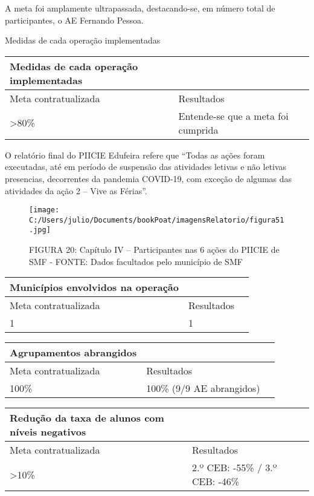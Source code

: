 \documentclass[
]{book}
\begin{document}
A meta foi amplamente ultrapassada, destacando-se, em número total de participantes, o AE Fernando Pessoa.

Medidas de cada operação implementadas

\begin{longtable}[]{@{}lll@{}}
\toprule()
Medidas de cada operação implementadas & & \\
\midrule()
\endhead
Meta contratualizada & Resultados & \\
\textgreater80\% & Entende-se que a meta foi cumprida & \\
\bottomrule()
\end{longtable}

O relatório final do PIICIE Edufeira refere que ``Todas as ações foram executadas, até em período de suspensão das atividades letivas e não letivas presencias, decorrentes da pandemia COVID-19, com exceção de algumas das atividades da ação 2 -- Vive as Férias''.

\begin{figure}
\centering
\texttt{[image: C:/Users/julio/Documents/bookPoat/imagensRelatorio/figura51.jpg]}
\caption{FIGURA 20: Capítulo IV -- Participantes nas 6 ações do PIICIE de SMF - FONTE: Dados facultados pelo município de SMF}
\end{figure}

\begin{longtable}[]{@{}lll@{}}
\toprule()
Municípios envolvidos na operação & & \\
\midrule()
\endhead
Meta contratualizada & Resultados & \\
1 & 1 & \\
\bottomrule()
\end{longtable}

\begin{longtable}[]{@{}lll@{}}
\toprule()
Agrupamentos abrangidos & & \\
\midrule()
\endhead
Meta contratualizada & Resultados & \\
100\% & 100\% (9/9 AE abrangidos) & \\
\bottomrule()
\end{longtable}

\begin{longtable}[]{@{}lll@{}}
\toprule()
Redução da taxa de alunos com níveis negativos & & \\
\midrule()
\endhead
Meta contratualizada & Resultados & \\
\textgreater10\% & 2.º CEB: -55\% / 3.º CEB: -46\% & \\
\bottomrule()
\end{longtable}
\end{document}
